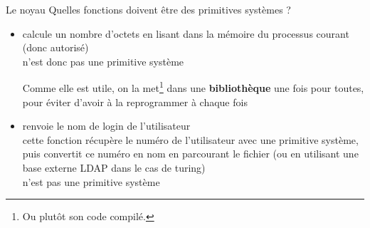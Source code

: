 \begin {frame} {Le noyau}
    Quelles fonctions doivent être des primitives systèmes ?

    \begin {itemize}
	\item {} calcule un nombre d'octets en lisant
	    dans la mémoire du processus courant (donc autorisé)
	    \\
	    \implique {} n'est donc pas une primitive système

	    \vspace* {1mm}

	    Comme elle est utile, on la met\footnote {Ou plutôt son code
	    compilé.} dans une \textbf {bibliothèque} une fois pour
	    toutes, pour éviter d'avoir à la reprogrammer à chaque fois

	\item {} renvoie le nom de login de l'utilisateur
	    \\
	    \implique cette fonction récupère le numéro de
	    l'utilisateur avec une primitive système, puis convertit ce
	    numéro en nom en parcourant le fichier 
	    (ou en utilisant une base externe LDAP dans le cas de turing)
	    \\
	    \implique {} n'est pas une primitive système

    \end {itemize}
\end {frame}

